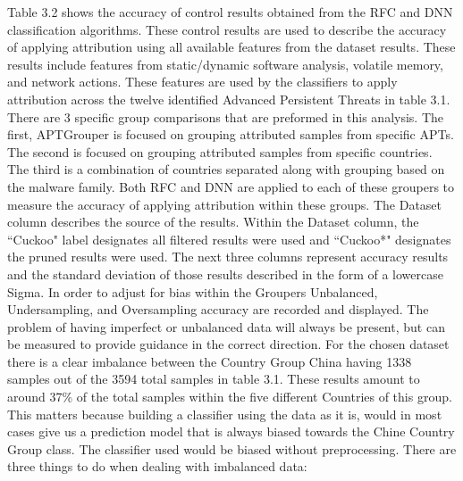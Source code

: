 \documentclass[12pt]{report}
\begin{document}
Table 3.2 shows the accuracy of control results obtained from the RFC and DNN classification algorithms.  These control results are used to describe the accuracy of applying attribution using all available features from the dataset results.  These results include features from static/dynamic software analysis, volatile memory, and network actions.  These features are used by the classifiers to apply attribution across the twelve identified Advanced Persistent Threats in table 3.1.  There are 3 specific group comparisons that are preformed in this analysis.  The first, APTGrouper is focused on grouping attributed samples from specific APTs.  The second is focused on grouping attributed samples from specific countries.  The third is a combination of countries separated along with grouping based on the malware family.  Both RFC and DNN are applied to each of these groupers to measure the accuracy of applying attribution within these groups.  The Dataset column describes the source of the results.  Within the Dataset column, the ``Cuckoo" label designates all filtered results were used and ``Cuckoo*" designates the pruned results were used.  The next three columns represent accuracy results and the standard deviation of those results described in the form of a lowercase Sigma.  In order to adjust for bias within the Groupers Unbalanced, Undersampling, and Oversampling accuracy are recorded and displayed.  The problem of having imperfect or unbalanced data will always be present, but can be measured to provide guidance in the correct direction.  For the chosen dataset there is a clear imbalance between the Country Group China having 1338 samples out of the 3594 total samples in table 3.1.  These results amount to around 37\% of the total samples within the five different Countries of this group.  This matters because building a classifier using the data as it is, would in most cases give us a prediction model that is always biased towards the Chine Country Group class.  The classifier used would be biased without preprocessing.  There are three things to do when dealing with imbalanced data:
\end{document}
